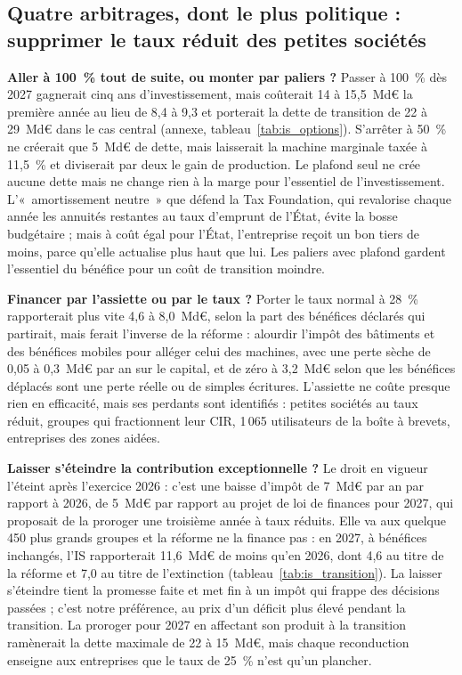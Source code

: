 \documentclass[11pt,a4paper]{article}
\begin{document}
\subsection{Quatre arbitrages, dont le plus politique : supprimer le taux réduit des petites sociétés}\label{sec:is_arbitrages}

\textbf{Aller à 100~\% tout de suite, ou monter par paliers ?} Passer à 100~\% dès 2027 gagnerait cinq ans
d'investissement, mais coûterait 14 à 15,5~Md€ la première année au lieu de 8,4 à 9,3 et porterait la dette de
transition de 22 à 29~Md€ dans le cas central (annexe, tableau~\ref{tab:is_options}). S'arrêter à 50~\% ne créerait que
5~Md€ de dette, mais laisserait la machine marginale taxée à 11,5~\% et diviserait par deux le gain de production. Le
plafond seul ne crée aucune dette mais ne change rien à la marge pour l'essentiel de l'investissement. L'«~amortissement
neutre~» que défend la Tax Foundation, qui revalorise chaque année les annuités restantes au taux d'emprunt de l'État,
évite la bosse budgétaire ; mais à coût égal pour l'État, l'entreprise reçoit un bon tiers de moins, parce qu'elle
actualise plus haut que lui. Les paliers avec plafond gardent l'essentiel du bénéfice pour un coût de transition
moindre.

\textbf{Financer par l'assiette ou par le taux ?} Porter le taux normal à 28~\% rapporterait plus vite 4,6 à 8,0~Md€,
selon la part des bénéfices déclarés qui partirait, mais ferait l'inverse de la réforme : alourdir l'impôt des
bâtiments et des bénéfices mobiles pour alléger celui des machines, avec une perte sèche de 0,05 à 0,3~Md€ par an sur
le capital, et de zéro à 3,2~Md€ selon que les bénéfices déplacés sont une perte réelle ou de simples écritures.
L'assiette ne coûte presque rien en efficacité, mais ses perdants sont identifiés : petites sociétés au taux réduit,
groupes qui fractionnent leur CIR, 1\,065 utilisateurs de la boîte à brevets, entreprises des zones aidées.

\textbf{Laisser s'éteindre la contribution exceptionnelle ?} Le droit en vigueur l'éteint après l'exercice 2026 : c'est
une baisse d'impôt de 7~Md€ par an par rapport à 2026, de 5~Md€ par rapport au projet de loi de finances pour 2027, qui
proposait de la proroger une troisième année à taux réduits. Elle va aux quelque 450 plus grands groupes et la réforme
ne la finance pas : en 2027, à bénéfices inchangés, l'IS rapporterait 11,6~Md€ de moins qu'en 2026, dont 4,6 au titre
de la réforme et 7,0 au titre de l'extinction (tableau~\ref{tab:is_transition}). La laisser s'éteindre tient la
promesse faite et met fin à un impôt qui frappe des décisions passées ; c'est notre préférence, au prix d'un déficit
plus élevé pendant la transition. La proroger pour 2027 en affectant son produit à la transition ramènerait la dette
maximale de 22 à 15~Md€, mais chaque reconduction enseigne aux entreprises que le taux de 25~\% n'est qu'un plancher.
\end{document}
